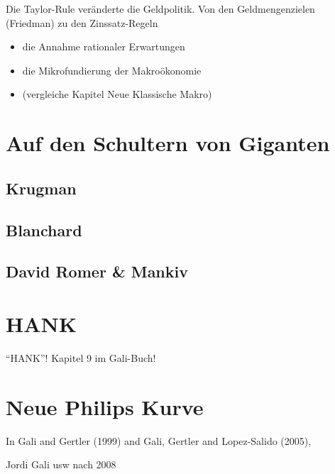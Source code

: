 Die Taylor-Rule veränderte die Geldpolitik. Von den Geldmengenzielen (Friedman) zu den Zinssatz-Regeln \parencite[S. 36]{Gali2007}





\begin{itemize}
	\item die Annahme rationaler Erwartungen
	\item die Mikrofundierung der Makroökonomie
	\item (vergleiche Kapitel Neue Klassische Makro)
\end{itemize}






\section{Auf den Schultern von Giganten}
\label{Giganten}

\subsection{Krugman}

\subsection{Blanchard}

\subsection{David Romer \& Mankiv}



\section{HANK}
"`HANK"'!
Kapitel 9 im Gali-Buch!

\section{Neue Philips Kurve}

In Gali and Gertler (1999) and Gali, Gertler and Lopez-Salido (2005),


Jordi Gali usw nach 2008







